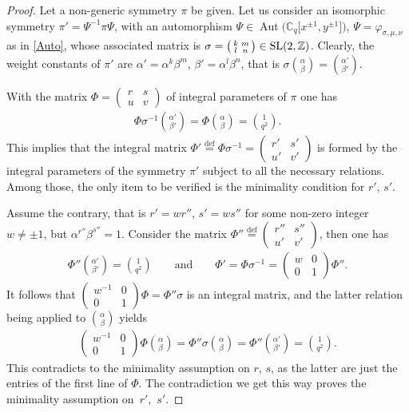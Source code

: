\documentclass[10pt,a4paper]{amsart}
\numberwithin{equation}{section}
\begin{document}
\begin{proof} Let a non-generic symmetry $\pi$ be given. Let us consider an isomorphic symmetry $\pi'=\Psi^{-1}\pi\Psi$, with an automorphism $\Psi\in\operatorname{Aut}\big(\mathbb{C}_q\big[x^{\pm 1},y^{\pm 1}\big]\big)$, $\Psi=\varphi_{\sigma,\mu,\nu}$ as in \eqref{Auto}, whose associated matrix is $\sigma=\left(\begin{smallmatrix}k & m\\ l & n\end{smallmatrix}\right)\in {\rm SL}(2,\mathbb{Z})$. Clearly, the weight constants of $\pi'$ are $\alpha'=\alpha^k\beta^m$, $\beta'=\alpha^l\beta^n$, that is $\sigma\binom\alpha\beta=\binom{\alpha'}{\beta'}$.

With the matrix $\Phi=\left(\begin{smallmatrix}r & s\\ u & v\end{smallmatrix}\right)$ of integral parameters of $\pi$ one has
\begin{gather*}
\Phi\sigma^{-1}\binom{\alpha'}{\beta'}=\Phi\binom\alpha\beta=\binom{1}{q^2}.
\end{gather*}
This implies that the integral matrix $\Phi'\stackrel{\mathrm{def}}{=}\Phi\sigma^{-1}=\left(\begin{smallmatrix}r' & s'\\ u' & v'\end{smallmatrix}\right)$ is formed by the integral parameters of the symmetry $\pi'$ subject to all the necessary relations. Among those, the only item to be verified is the minimality condition for $r'$, $s'$.

Assume the contrary, that is $r'=wr''$, $s'=ws''$ for some non-zero integer $w\ne\pm 1$, but $\alpha^{r''}\beta^{s''}=1$. Consider the matrix $\Phi''\stackrel{\mathrm{def}}{=}\left(\begin{smallmatrix}r'' & s''\\ u' & v'\end{smallmatrix}\right)$, then one has
\begin{gather*}
\Phi''\binom{\alpha'}{\beta'}=\binom{1}{q^2}\qquad\text{and}\qquad
\Phi'=\Phi\sigma^{-1}=\begin{pmatrix}w & 0\\ 0 & 1\end{pmatrix}\Phi''.
\end{gather*}
It follows that $\left(\begin{smallmatrix}w^{-1} & 0\\ 0 & 1\end{smallmatrix}\right)\Phi=\Phi''\sigma$ is an integral matrix, and the latter relation being applied to $\binom\alpha\beta$ yields
\begin{gather*}
\begin{pmatrix}w^{-1} & 0\\ 0 & 1\end{pmatrix}\Phi\binom\alpha\beta=\Phi''\sigma\binom\alpha\beta=
\Phi''\binom{\alpha'}{\beta'}=\binom{1}{q^2}.
\end{gather*}
This contradicts to the minimality assumption on $r$, $s$, as the latter are just the entries of the first line of $\Phi$. The contradiction we get this way proves the minimality assumption on~$r'$,~$s'$.


\end{proof}
\end{document}
